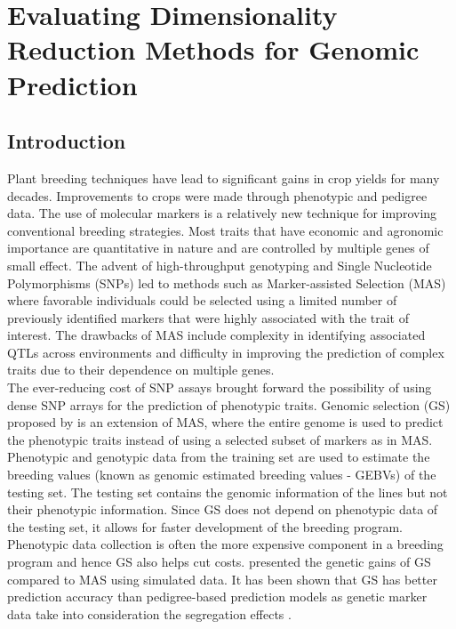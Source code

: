 \chapter{Evaluating Dimensionality Reduction Methods for Genomic Prediction}
    
\section{Introduction}

Plant breeding techniques have lead to significant gains in crop yields for many decades. Improvements to crops were made through phenotypic and pedigree data. The use of molecular markers is a relatively new technique for improving conventional breeding strategies. Most traits that have economic and agronomic importance are quantitative in nature and are controlled by multiple genes of small effect. The advent of high-throughput genotyping and Single Nucleotide Polymorphisms (SNPs) led to methods such as Marker-assisted Selection (MAS) where favorable individuals could be selected using a limited number of previously identified markers that were highly associated with the trait of interest. The drawbacks of MAS include complexity in identifying associated QTLs across environments and difficulty in improving the prediction of complex traits due to their dependence on multiple genes.\\

The ever-reducing cost of SNP assays brought forward the possibility of using dense SNP arrays for the prediction of phenotypic traits. Genomic selection (GS) proposed by \cite{meuwissen_prediction_2001} is an extension of MAS, where the entire genome is used to predict the phenotypic traits instead of using a selected subset of markers as in MAS. Phenotypic and genotypic data from the training set are used to estimate the breeding values (known as genomic estimated breeding values - GEBVs) of the testing set. The testing set contains the genomic information of the lines but not their phenotypic information. Since GS does not depend on phenotypic data of the testing set, it allows for faster development of the breeding program. Phenotypic data collection is often the more expensive component in a breeding program and hence GS also helps cut costs. \cite{bernardo_prospects_2007} presented the genetic gains of GS compared to MAS using simulated data. It has been shown that GS has better prediction accuracy than pedigree-based prediction models as genetic marker data take into consideration the segregation effects \cite{de_los_campos_predicting_2009, crossa_genomic_2011, crossa_prediction_2010}. \\

